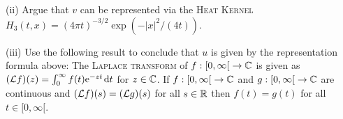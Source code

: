 \documentclass[12pt,a4paper]{article}
\begin{document}
(ii) Argue that $v$ can be represented via the \textsc{Heat Kernel}
$H_3(t,x) = (4\pi t)^{-3/2}\exp(-|x|^2/(4t))$.

(iii) Use the following result to conclude that $u$ 
is given by the representation formula above:
The \textsc{Laplace transform} of $f:\left[0,\infty\right[\to {\mathbb C}$
is given as $({\mathcal L} f)(z) 
= \int_0^\infty f(t)\mathrm{e}^{-zt}\;\!\mathrm{d} t$ for $z\in {\mathbb C}$. If $f:\left[0,\infty\right[\to {\mathbb C}$ and
$g:\left[0,\infty\right[\to{\mathbb C}$ are continuous and $({\mathcal L} f)(s) =({\mathcal L} g)(s)$
for all $s\in {\mathbb R}$ then $f(t)=g(t)$ for all $t\in[0,\infty[$.
\end{document}
